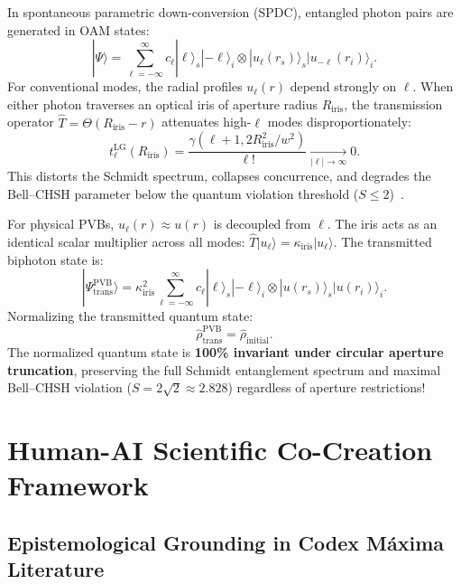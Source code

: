\documentclass{optica-article}
\begin{document}
In spontaneous parametric down-conversion (SPDC), entangled photon pairs are generated in OAM states:
\begin{equation}
|\Psi\rangle = \sum_{\ell=-\infty}^\infty c_\ell |\ell\rangle_s |-\ell\rangle_i \otimes |u_\ell(r_s)\rangle_s |u_{-\ell}(r_i)\rangle_i.
\label{eq:spdc_biphoton_state}
\end{equation}
For conventional modes, the radial profiles $u_\ell(r)$ depend strongly on $\ell$. When either photon traverses an optical iris of aperture radius $R_{\text{iris}}$, the transmission operator $\hat{T} = \Theta(R_{\text{iris}} - r)$ attenuates high-$\ell$ modes disproportionately:
\begin{equation}
t_\ell^{\text{LG}}(R_{\text{iris}}) = \frac{\gamma(\ell+1, 2 R_{\text{iris}}^2 / w^2)}{\ell!} \xrightarrow[|\ell| \to \infty]{} 0.
\label{eq:lg_pupil_attenuation}
\end{equation}
This distorts the Schmidt spectrum, collapses concurrence, and degrades the Bell--CHSH parameter below the quantum violation threshold ($S \le 2$)~\cite{Clauser1969,LawEberly2004,Walborn2010}.

For physical PVBs, $u_\ell(r) \approx u(r)$ is decoupled from $\ell$. The iris acts as an identical scalar multiplier across all modes: $\hat{T} |u_\ell\rangle = \kappa_{\text{iris}} |u_\ell\rangle$. The transmitted biphoton state is:
\begin{equation}
|\Psi_{\text{trans}}^{\text{PVB}}\rangle = \kappa_{\text{iris}}^2 \sum_{\ell=-\infty}^\infty c_\ell |\ell\rangle_s |-\ell\rangle_i \otimes |u(r_s)\rangle_s |u(r_i)\rangle_i.
\label{eq:pvb_transmitted_biphoton}
\end{equation}
Normalizing the transmitted quantum state:
\begin{equation}
\boxed{\hat{\rho}_{\text{trans}}^{\text{PVB}} = \hat{\rho}_{\text{initial}}.}
\label{eq:rho_invariance}
\end{equation}
The normalized quantum state is \textbf{100\% invariant under circular aperture truncation}, preserving the full Schmidt entanglement spectrum and maximal Bell--CHSH violation ($S = 2\sqrt{2} \approx 2.828$) regardless of aperture restrictions!

\section{Human-AI Scientific Co-Creation Framework}
\label{sec:co_creation}

\subsection{Epistemological Grounding in Codex Máxima Literature}
\end{document}
